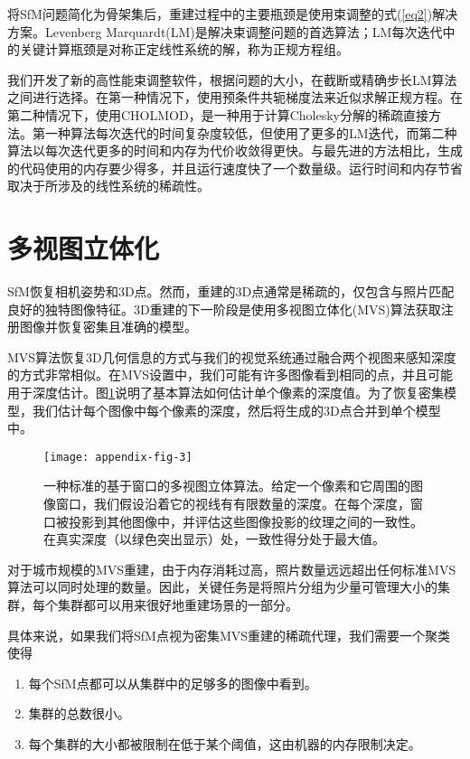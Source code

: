 \begin{translation}
将SfM问题简化为骨架集后，重建过程中的主要瓶颈是使用束调整的式(\ref{eq2})解决方案。Levenberg Marquardt(LM)是解决束调整问题的首选算法；LM每次迭代中的关键计算瓶颈是对称正定线性系统的解，称为正规方程组。

我们开发了新的高性能束调整软件，根据问题的大小，在截断或精确步长LM算法之间进行选择。在第一种情况下，使用预条件共轭梯度法来近似求解正规方程。在第二种情况下，使用CHOLMOD\cite{chen2008algorithm}，是一种用于计算Cholesky分解的稀疏直接方法。第一种算法每次迭代的时间复杂度较低，但使用了更多的LM迭代，而第二种算法以每次迭代更多的时间和内存为代价收敛得更快。与最先进的方法相比，生成的代码使用的内存要少得多，并且运行速度快了一个数量级。运行时间和内存节省取决于所涉及的线性系统的稀疏性\cite{agarwal2010bundle}。

\section{多视图立体化}
SfM恢复相机姿势和3D点。然而，重建的3D点通常是稀疏的，仅包含与照片匹配良好的独特图像特征。3D重建的下一阶段是使用多视图立体化(MVS)算法获取注册图像并恢复密集且准确的模型。

MVS算法恢复3D几何信息的方式与我们的视觉系统通过融合两个视图来感知深度的方式非常相似。在MVS设置中，我们可能有许多图像看到相同的点，并且可能用于深度估计。图\ref{appendix-fig-3}说明了基本算法如何估计单个像素的深度值。为了恢复密集模型，我们估计每个图像中每个像素的深度，然后将生成的3D点合并到单个模型中。
\begin{figure}
	\centering
	\texttt{[image: appendix-fig-3]}
	\caption[]{一种标准的基于窗口的多视图立体算法。给定一个像素和它周围的图像窗口，我们假设沿着它的视线有有限数量的深度。在每个深度，窗口被投影到其他图像中，并评估这些图像投影的纹理之间的一致性。在真实深度（以绿色突出显示）处，一致性得分处于最大值。}
	\label{appendix-fig-3}
\end{figure}

对于城市规模的MVS重建，由于内存消耗过高，照片数量远远超出任何标准MVS算法可以同时处理的数量。因此，关键任务是将照片分组为少量可管理大小的集群，每个集群都可以用来很好地重建场景的一部分。

具体来说，如果我们将SfM点视为密集MVS重建的稀疏代理，我们需要一个聚类使得
\begin{enumerate}
	\item 每个SfM点都可以从集群中的足够多的图像中看到。
	\item 集群的总数很小。
	\item 每个集群的大小都被限制在低于某个阈值，这由机器的内存限制决定。
\end{enumerate}


\end{translation}
